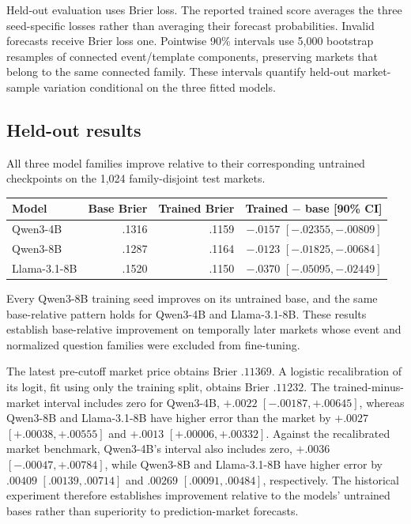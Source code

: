 Held-out evaluation uses Brier loss.
The reported trained score averages the three seed-specific losses rather than averaging their forecast probabilities.
Invalid forecasts receive Brier loss one.
Pointwise 90\% intervals use 5,000 bootstrap resamples of connected event/template components, preserving markets that belong to the same connected family.
These intervals quantify held-out market-sample variation conditional on the three fitted models.

\subsection{Held-out results}
\label{app:exp3b-results}

All three model families improve relative to their corresponding untrained checkpoints on the 1,024 family-disjoint test markets.

\begin{center}
\begin{minipage}{0.88\linewidth}
\centering
{}
\label{tab:exp4-endpoint-results}
\small
\begin{tabular}{lrrr}
\toprule
Model & Base Brier & Trained Brier & Trained \(-\) base [90\% CI] \\
\midrule
Qwen3-4B & .1316 & .1159 & $-.0157$ $[-.02355,-.00809]$ \\
Qwen3-8B & .1287 & .1164 & $-.0123$ $[-.01825,-.00684]$ \\
Llama-3.1-8B & .1520 & .1150 & $-.0370$ $[-.05095,-.02449]$ \\
\bottomrule
\end{tabular}
\end{minipage}
\end{center}

Every Qwen3-8B training seed improves on its untrained base, and the same base-relative pattern holds for Qwen3-4B and Llama-3.1-8B.
These results establish base-relative improvement on temporally later markets whose event and normalized question families were excluded from fine-tuning.

The latest pre-cutoff market price obtains Brier $.11369$.
A logistic recalibration of its logit, fit using only the training split, obtains Brier $.11232$.
The trained-minus-market interval includes zero for Qwen3-4B, $+.0022$ \( [-.00187,+.00645] \), whereas Qwen3-8B and Llama-3.1-8B have higher error than the market by $+.0027$ \( [+.00038,+.00555] \) and $+.0013$ \( [+.00006,+.00332] \).
Against the recalibrated market benchmark, Qwen3-4B's interval also includes zero, $+.0036$ \( [-.00047,+.00784] \), while Qwen3-8B and Llama-3.1-8B have higher error by $.00409$ \( [.00139,.00714] \) and $.00269$ \( [.00091,.00484] \), respectively.
The historical experiment therefore establishes improvement relative to the models' untrained bases rather than superiority to prediction-market forecasts.

